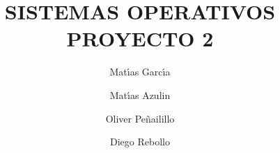 \documentclass[10pt, a4paper]{amsart}
\author{Mat\'{\i}as Garc\'{\i}a}
\author{Mat\'{\i}as Azulin}
\author{Oliver Pe\~{n}ailillo}
\author{Diego Rebollo}
\begin{document}
\title{SISTEMAS OPERATIVOS\\PROYECTO 2}

\maketitle
\end{document}
